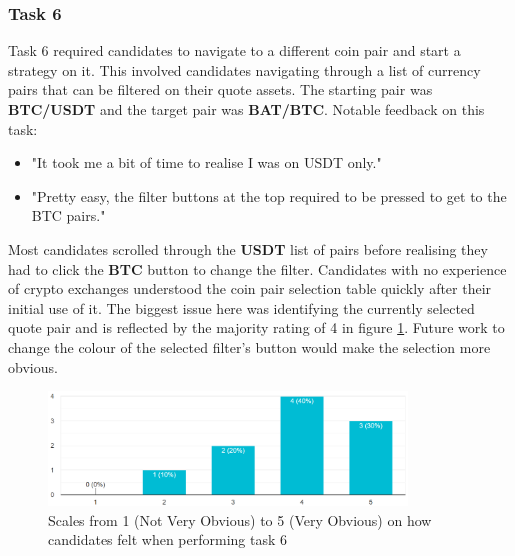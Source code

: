 

\subsubsection{Task 6}
\label{sec:evaluation:ui:tasks:q6}
Task 6 required candidates to navigate to a different coin pair and start a strategy on it. This involved candidates navigating through a list of currency pairs that can be filtered on their quote assets. The starting pair was \textbf{BTC/USDT} and the target pair was \textbf{BAT/BTC}. Notable feedback on this task:
\begin{itemize}
\item "It took me a bit of time to realise I was on USDT only."
\item "Pretty easy, the filter buttons at the top required to be pressed to get to the BTC pairs."
\end{itemize}
Most candidates scrolled through the \textbf{USDT} list of pairs before realising they had to click the \textbf{BTC} button to change the filter. Candidates with no experience of crypto exchanges understood the coin pair selection table quickly after their initial use of it. The biggest issue here was identifying the currently selected quote pair and is reflected by the majority rating of 4 in figure \ref{fig:eval:web_app:task6_obvious}. Future work to change the colour of the selected filter's button would make the selection more obvious. 
\begin{figure}[ht]
  \centering
 \includegraphics[width=0.85\textwidth]{content/graphics/task6_obvious.PNG}
  \caption{Scales from 1 (Not Very Obvious) to 5 (Very Obvious) on how candidates felt when performing task 6}
  \label{fig:eval:web_app:task6_obvious}
\end{figure}



